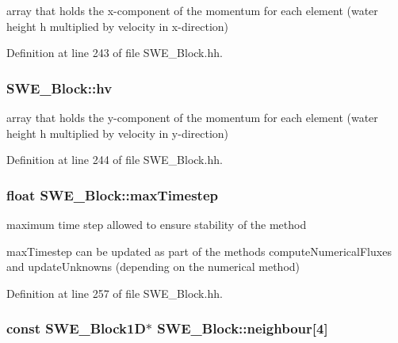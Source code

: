 array that holds the x-\/component of the momentum for each element (water height h multiplied by velocity in x-\/direction) 



Definition at line 243 of file S\+W\+E\+\_\+\+Block.\+hh.

\subsubsection[{\texorpdfstring{hv}{hv}}]{ S\+W\+E\+\_\+\+Block\+::hv\hspace{0.3cm}{\ttfamily [protected]}}\hypertarget{classSWE__Block_a0897aa3c2d78749f209c95e08196d831}{}\label{classSWE__Block_a0897aa3c2d78749f209c95e08196d831}


array that holds the y-\/component of the momentum for each element (water height h multiplied by velocity in y-\/direction) 



Definition at line 244 of file S\+W\+E\+\_\+\+Block.\+hh.

\subsubsection[{\texorpdfstring{max\+Timestep}{maxTimestep}}]{\setlength{\rightskip}{0pt plus 5cm}float S\+W\+E\+\_\+\+Block\+::max\+Timestep\hspace{0.3cm}{\ttfamily [protected]}}\hypertarget{classSWE__Block_a05cbc9b40e0483bf73dbc2bdeae7dee3}{}\label{classSWE__Block_a05cbc9b40e0483bf73dbc2bdeae7dee3}


maximum time step allowed to ensure stability of the method 

max\+Timestep can be updated as part of the methods compute\+Numerical\+Fluxes and update\+Unknowns (depending on the numerical method) 

Definition at line 257 of file S\+W\+E\+\_\+\+Block.\+hh.

\subsubsection[{\texorpdfstring{neighbour}{neighbour}}]{\setlength{\rightskip}{0pt plus 5cm}const {\bf S\+W\+E\+\_\+\+Block1D}$\ast$ S\+W\+E\+\_\+\+Block\+::neighbour\mbox{[}4\mbox{]}\hspace{0.3cm}{\ttfamily [protected]}}\hypertarget{classSWE__Block_a5ea4ea4815af9eb66c51de9ad9b8d148}{}\label{classSWE__Block_a5ea4ea4815af9eb66c51de9ad9b8d148}


